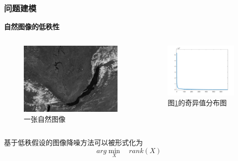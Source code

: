 \documentclass[10pt,aspectratio=43,mathserif]{beamer}
\begin{document}
\begin{frame}
\frametitle{\textbf{问题建模}}
\begin{block}{\textbf{自然图像的低秩性}}
\begin{columns}
\begin{figure}[!t]
\centering
\includegraphics[scale=0.12]{x.png}
\caption{一张自然图像}
\label{example-figure}
\end{figure}

\begin{figure}[!t]
\centering
\includegraphics[scale=0.21]{y.png}
\caption{图\ref{example-figure}的奇异值分布图}
\label{example-figure-svd}
\end{figure}
\end{columns}
\end{block}
\par 基于低秩假设的图像降噪方法可以被形式化为
\begin{displaymath}
arg\min\limits_{X} \quad rank(X)
\end{displaymath}
\end{frame}
\end{document}
